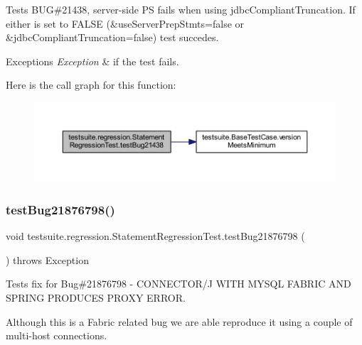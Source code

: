 Tests B\+UG\#21438, server-\/side PS fails when using jdbc\+Compliant\+Truncation. If either is set to F\+A\+L\+SE (\&use\+Server\+Prep\+Stmts=false or \&jdbc\+Compliant\+Truncation=false) test succedes.


\begin{DoxyExceptions}{Exceptions}
{\em Exception} & if the test fails. \\
\hline
\end{DoxyExceptions}
Here is the call graph for this function\+:
\nopagebreak
\begin{figure}[H]
\begin{center}
\leavevmode
\includegraphics[width=350pt]{classtestsuite_1_1regression_1_1_statement_regression_test_a47c163cd72fcd1b2cf392941cd2b074c_cgraph}
\end{center}
\end{figure}
\mbox{\label{classtestsuite_1_1regression_1_1_statement_regression_test_a7c2127e901386b163bff95c5a884f307}} 
\subsubsection{\texorpdfstring{test\+Bug21876798()}{testBug21876798()}}
{\footnotesize\ttfamily void testsuite.\+regression.\+Statement\+Regression\+Test.\+test\+Bug21876798 (\begin{DoxyParamCaption}{ }\end{DoxyParamCaption}) throws Exception}

Tests fix for Bug\#21876798 -\/ C\+O\+N\+N\+E\+C\+T\+O\+R/J W\+I\+TH M\+Y\+S\+QL F\+A\+B\+R\+IC A\+ND S\+P\+R\+I\+NG P\+R\+O\+D\+U\+C\+ES P\+R\+O\+XY E\+R\+R\+OR.

Although this is a Fabric related bug we are able reproduce it using a couple of multi-\/host connections. \mbox{\label{classtestsuite_1_1regression_1_1_statement_regression_test_ae2acdb736d0a4481a43f894bd9f40499}} 
